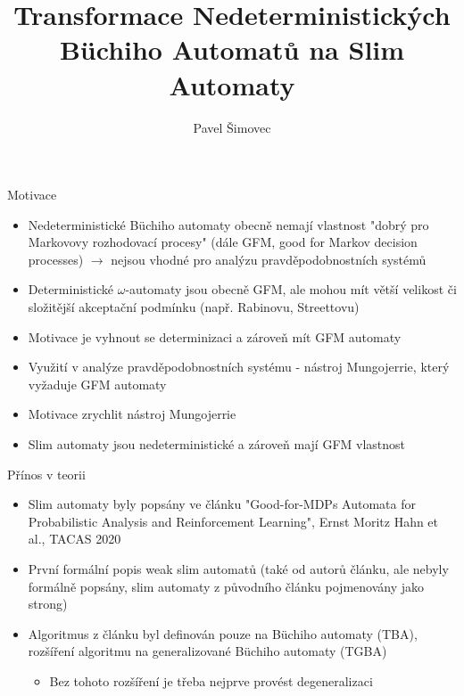 \documentclass[
]{beamer}
\title[Slim Automata]{Transformace Nedeterministických Büchiho Automatů na Slim Automaty}
\author[P. Šimovec]{Pavel Šimovec\texorpdfstring{\\}{, }}
\institute[FI MU]{Fakulta Informatiky, Masarykova Univerzita}
\date{\formatdate{30}{6}{2021}}
\begin{document}
	
	\begin{frame}
		\maketitle
	\end{frame}
	



	\begin{frame}{Motivace}
		\begin{itemize}
			\pause
			\item Nedeterministické Büchiho automaty obecně nemají vlastnost \alert{"dobrý pro Markovovy rozhodovací procesy"} (dále \alert{GFM}, good for Markov decision processes) $\rightarrow$ nejsou vhodné pro analýzu pravděpodobnostních systémů
			\pause
			\item Deterministické $\omega$-automaty jsou obecně GFM, ale mohou mít větší velikost či složitější akceptační podmínku (např. Rabinovu, Streettovu)
			\pause
			\item Motivace je vyhnout se determinizaci a zároveň mít GFM automaty
			\pause
			\item Využití v analýze pravděpodobnostních systému - nástroj \alert{Mungojerrie}, který vyžaduje GFM automaty
			\pause
			\item Motivace zrychlit nástroj Mungojerrie
			\pause
			\item Slim automaty jsou nedeterministické a zároveň mají GFM vlastnost
		\end{itemize}
	\end{frame}

	\begin{frame}{Přínos v teorii}
		\begin{itemize}
			\pause
			\item Slim automaty byly popsány ve článku "Good-for-MDPs Automata for Probabilistic Analysis and Reinforcement
			Learning", Ernst Moritz Hahn et al., TACAS 2020
			\pause
			\item První formální popis \alert{weak slim automatů} (také od autorů článku, ale nebyly formálně popsány, slim automaty z původního článku pojmenovány jako \alert{strong})
			\pause
			\item Algoritmus z článku byl definován pouze na Büchiho automaty (TBA), rozšíření algoritmu na \alert{generalizované} Büchiho automaty (TGBA)
			\pause
			\begin{itemize}
			\item Bez tohoto rozšíření je třeba nejprve provést degeneralizaci
			\end{itemize}
			
		\end{itemize}
	
	
	\end{frame}
	
\end{document}
